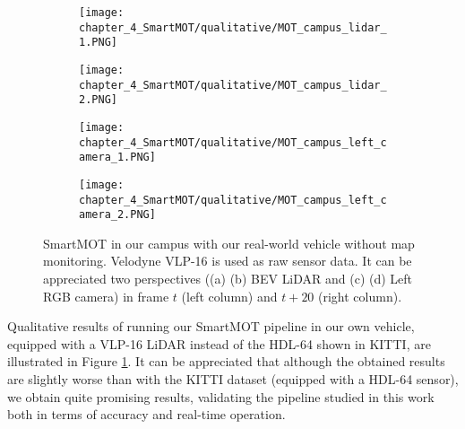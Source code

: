 \begin{figure}[h]
	\centering
	\begin{subfigure}{0.43\textwidth}
		\captionsetup{justification=centering}
		\texttt{[image: chapter\_4\_SmartMOT/qualitative/MOT\_campus\_lidar\_1.PNG]}
		\caption{}
	\end{subfigure}
	\hfill
	\begin{subfigure}{0.43\textwidth}
		\captionsetup{justification=centering}
		\texttt{[image: chapter\_4\_SmartMOT/qualitative/MOT\_campus\_lidar\_2.PNG]}
		\caption{}
	\end{subfigure}
	\hfill
	\begin{subfigure}{0.43\textwidth}
		\captionsetup{justification=centering}
		\texttt{[image: chapter\_4\_SmartMOT/qualitative/MOT\_campus\_left\_camera\_1.PNG]}
		\caption{}
	\end{subfigure}
	\hfill
	\begin{subfigure}{0.43\textwidth}
		\captionsetup{justification=centering}
		\texttt{[image: chapter\_4\_SmartMOT/qualitative/MOT\_campus\_left\_camera\_2.PNG]}
		\caption{}
	\end{subfigure}
	\captionsetup{justification=justified}
	\caption[SmartMOT in our campus with our real-world vehicle without map monitoring]{SmartMOT in our campus with our real-world vehicle without map monitoring. Velodyne VLP-16 is used as raw sensor data. It can be appreciated two perspectives ((a) (b) \ac{BEV} \ac{LiDAR} and (c) (d) Left RGB camera) in frame $t$ (left column) and $t+20$ (right column).}
	\label{fig:chapter_4_SmartMOT/MOT_campus}
\end{figure}

Qualitative results of running our SmartMOT pipeline in our own vehicle, equipped with a VLP-16 \ac{LiDAR} instead of the HDL-64 shown in KITTI, are illustrated in Figure \ref{fig:chapter_4_SmartMOT/MOT_campus}. It can be appreciated that although the obtained results are slightly worse than with the KITTI dataset (equipped with a HDL-64 sensor), we obtain quite promising results, validating the pipeline studied in this work both in terms of accuracy and real-time operation.

